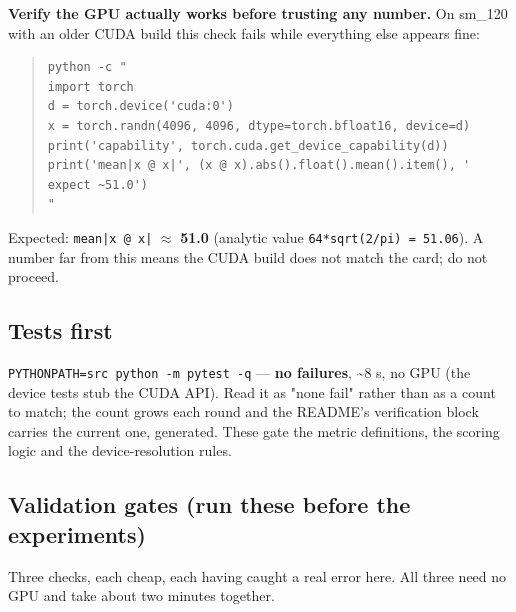 \textbf{Verify the GPU actually works before trusting any number.} On sm\_120 with an older CUDA build this check fails while everything else appears fine:

\begin{quote}\tiny\begin{verbatim}
python -c "
import torch
d = torch.device('cuda:0')
x = torch.randn(4096, 4096, dtype=torch.bfloat16, device=d)
print('capability', torch.cuda.get_device_capability(d))
print('mean|x @ x|', (x @ x).abs().float().mean().item(), '  expect ~51.0')
"
\end{verbatim}\end{quote}

Expected: \texttt{mean|x @ x|} $\approx$ \textbf{51.0} (analytic value \texttt{64*sqrt(2/\allowbreak{}pi) = 51.\allowbreak{}06}). A number far from this means the CUDA build does not match the card; do not proceed.

\subsection{Tests first}

\texttt{PYTHONPATH=src python -\allowbreak{}m pytest -\allowbreak{}q} --- \textbf{no failures}, \textasciitilde{}8 s, no GPU (the device tests stub the CUDA API). Read it as "none fail" rather than as a count to match; the count grows each round and the README's verification block carries the current one, generated. These gate the metric definitions, the scoring logic and the device-resolution rules.

\subsection{Validation gates (run these before the experiments)}

Three checks, each cheap, each having caught a real error here. All three need no GPU and take about two minutes together.

